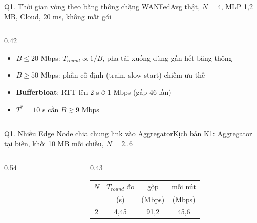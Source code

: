 \documentclass[aspectratio=169,10pt]{beamer}
\begin{document}
\begin{frame}{Q1. Thời gian vòng theo băng thông chặng WAN}{FedAvg thật, $N = 4$, MLP 1,2 MB, Cloud, 20 ms, không mất gói}
\begin{columns}[c]
\begin{column}{0.42\textwidth}
      \begin{itemize}\footnotesize
        \item $B \le 20$ Mbps: $T_{round} \propto 1/B$, pha tải xuống dùng gần hết băng thông
        \item $B \ge 50$ Mbps: phần cố định (train, slow start) chiếm ưu thế
        \item \textbf{Bufferbloat}: RTT lên 2 s ở 1 Mbps (gấp 46 lần)
        \item $T^* = 10$ s cần $B \gtrsim 9$ Mbps
      \end{itemize}
    \end{column}
  \end{columns}
\end{frame}

\begin{frame}{Q1. Nhiều Edge Node chia chung link vào Aggregator}{Kịch bản K1: Aggregator tại biên, khối 10 MB mỗi chiều, $N = 2..6$}
  \begin{columns}[c]
    \begin{column}{0.54\textwidth}
      \centering
    \end{column}
    \begin{column}{0.43\textwidth}
      \scriptsize
      \begin{tabular}{c c c c}
        \toprule
        $N$ & $T_{round}$ đo & gộp & mỗi nút \\
         & (s) & (Mbps) & (Mbps) \\
        \midrule
        2 & 4,45 & 91,2 & 45,6 \\

\end{tabular}
\end{column}
\end{columns}
\end{frame}
\end{document}
